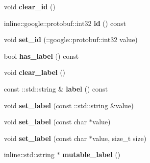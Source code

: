 \begin{DoxyCompactItemize}
\item 
\hypertarget{classgraph_1_1Graph__Edge_ab04135cf552e93eceb7abb38077140ba}{
void {\bfseries clear\_\-id} ()}
\label{classgraph_1_1Graph__Edge_ab04135cf552e93eceb7abb38077140ba}

\item 
\hypertarget{classgraph_1_1Graph__Edge_a3cb43575a65d2d2b4b3f10f2f368a6e5}{
inline::google::protobuf::int32 {\bfseries id} () const }
\label{classgraph_1_1Graph__Edge_a3cb43575a65d2d2b4b3f10f2f368a6e5}

\item 
\hypertarget{classgraph_1_1Graph__Edge_a9d0281649c61d01a499e9d4a0dcc35bb}{
void {\bfseries set\_\-id} (::google::protobuf::int32 value)}
\label{classgraph_1_1Graph__Edge_a9d0281649c61d01a499e9d4a0dcc35bb}

\item 
\hypertarget{classgraph_1_1Graph__Edge_a002aa4e1a3cbb1d3ae04f811ad5499f5}{
bool {\bfseries has\_\-label} () const }
\label{classgraph_1_1Graph__Edge_a002aa4e1a3cbb1d3ae04f811ad5499f5}

\item 
\hypertarget{classgraph_1_1Graph__Edge_a88236828360ba4677de28dcd11a0c892}{
void {\bfseries clear\_\-label} ()}
\label{classgraph_1_1Graph__Edge_a88236828360ba4677de28dcd11a0c892}

\item 
\hypertarget{classgraph_1_1Graph__Edge_a1c2c35183332758b8519875e9a6d9bad}{
const ::std::string \& {\bfseries label} () const }
\label{classgraph_1_1Graph__Edge_a1c2c35183332758b8519875e9a6d9bad}

\item 
\hypertarget{classgraph_1_1Graph__Edge_ae0b7d66524cdb3c239a4658c6ebe49ed}{
void {\bfseries set\_\-label} (const ::std::string \&value)}
\label{classgraph_1_1Graph__Edge_ae0b7d66524cdb3c239a4658c6ebe49ed}

\item 
\hypertarget{classgraph_1_1Graph__Edge_a5e28d3ae41aa291b904c97f8086e6599}{
void {\bfseries set\_\-label} (const char $\ast$value)}
\label{classgraph_1_1Graph__Edge_a5e28d3ae41aa291b904c97f8086e6599}

\item 
\hypertarget{classgraph_1_1Graph__Edge_ab5e92ddc8c7a81e0e7689cb86dac75ce}{
void {\bfseries set\_\-label} (const char $\ast$value, size\_\-t size)}
\label{classgraph_1_1Graph__Edge_ab5e92ddc8c7a81e0e7689cb86dac75ce}

\item 
\hypertarget{classgraph_1_1Graph__Edge_a79e66e701e4f30c74db839df05649037}{
inline::std::string $\ast$ {\bfseries mutable\_\-label} ()}
\label{classgraph_1_1Graph__Edge_a79e66e701e4f30c74db839df05649037}


\end{DoxyCompactItemize}
